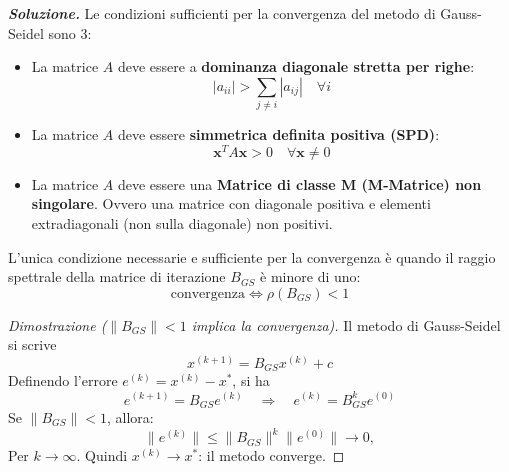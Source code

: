 \begin{enumerate}
    \textcolor{Green3}{\textbf{\emph{Soluzione.}}} Le condizioni sufficienti per la convergenza del metodo di Gauss-Seidel sono 3:
    \begin{itemize}
        \item La matrice $A$ deve essere a \textbf{dominanza diagonale stretta per righe}:
        \begin{equation*}
            \left|a_{ii}\right| > \displaystyle\sum_{j \ne i} \left|a_{ij}\right| \hspace{1em} \forall i
        \end{equation*}
        \item La matrice $A$ deve essere \textbf{simmetrica definita positiva (SPD)}:
        \begin{equation*}
            \mathbf{x}^{T} A \mathbf{x} > 0 \hspace{1em} \forall \mathbf{x} \ne 0
        \end{equation*}
        \item La matrice $A$ deve essere una \textbf{Matrice di classe M (M-Matrice) non singolare}. Ovvero una matrice con diagonale positiva e elementi extradiagonali (non sulla diagonale) non positivi.
    \end{itemize}
    L'unica condizione necessarie e sufficiente per la convergenza è quando il raggio spettrale della matrice di iterazione $B_{GS}$ è minore di uno:
    \begin{equation*}
        \text{convergenza} \iff \rho(B_{GS}) < 1
    \end{equation*}
    \begin{proof}[Dimostrazione ($\left\| B_{GS} \right\| < 1$ implica la convergenza)]
        Il metodo di Gauss-Seidel si scrive
        \begin{equation*}
            x^{(k+1)} = B_{GS}x^{(k)} + c
        \end{equation*}
        Definendo l'errore $e^{(k)} = x^{(k)} - x^{*}$, si ha
        \begin{equation*}
            e^{(k+1)} = B_{GS} e^{(k)} \quad \Rightarrow \quad e^{(k)} = B_{GS}^k e^{(0)}
        \end{equation*}
        Se $\|B_{GS}\| < 1$, allora:
        \begin{equation*}
            \|e^{(k)}\| \le \|B_{GS}\|^k \|e^{(0)}\| \to 0,
        \end{equation*}
        Per $k \to \infty$. Quindi $x^{(k)} \to x^\ast$: il metodo converge.
    \end{proof}
\end{enumerate}
